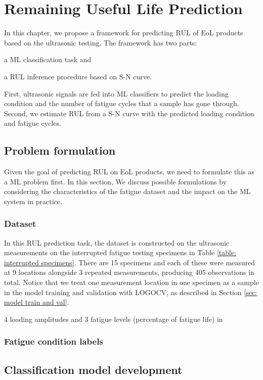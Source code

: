 \chapter{Remaining Useful Life Prediction}
\label{chap: rul}

In this chapter, we propose a framework for predicting RUL of EoL products based on the ultrasonic testing. The framework has two parts: \begin{enumerate*}[label=\itshape\alph*\upshape)]
    \item a ML classification task and
    \item a RUL inference procedure based on S-N curve.
\end{enumerate*}  First, ultrasonic signals are fed into ML classifiers to predict the loading condition and the number of fatigue cycles that a sample has gone through. Second, we estimate RUL from a S-N curve with the predicted loading condition and fatigue cycles.

\section{Problem formulation}
Given the goal of predicting RUL on EoL products, we need to formulate this as a ML problem first. In this section, We discuss possible formulations by considering the characteristics of the fatigue dataset and the impact on the ML system in practice.

\subsection{Dataset}
In this RUL prediction task, the dataset is constructed on the ultrasonic measurements on the interrupted fatigue testing specimens in Table \ref{table: interrupted specimens}. There are 15 specimens and each of these were measured at 9 locations alongside 3 repeated measurements, producing 405 observations in total. Notice that we treat one measurement location in one specimen as a sample in the model training and validation with LOGOCV, as described in Section \ref{sec: model train and val}.

4 loading amplitudes and 3 fatigue levels (percentage of fatigue life) in 


\subsection{Fatigue condition labels}
\section{Classification model development}

